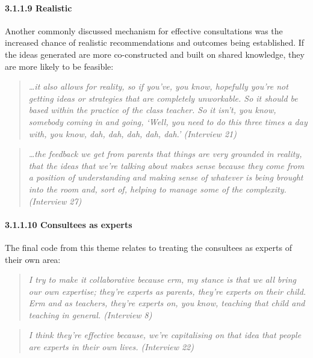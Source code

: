 \documentclass[
]{article}
\begin{document}
\hypertarget{realistic}{%
\paragraph{3.1.1.9 Realistic}\label{realistic}}

Another commonly discussed mechanism for effective consultations was the
increased chance of realistic recommendations and outcomes being
established. If the ideas generated are more co-constructed and built on
shared knowledge, they are more likely to be feasible:

\begin{quote}
\emph{\ldots it also allows for reality, so if you've, you know,
hopefully you're not getting ideas or strategies that are completely
unworkable. So it should be based within the practice of the class
teacher. So it isn't, you know, somebody coming in and going, `Well, you
need to do this three times a day with, you know, dah, dah, dah, dah,
dah.' (Interview 21)}
\end{quote}

\begin{quote}
\emph{\ldots the feedback we get from parents that things are very
grounded in reality, that the ideas that we're talking about makes sense
because they come from a position of understanding and making sense of
whatever is being brought into the room and, sort of, helping to manage
some of the complexity. (Interview 27)}
\end{quote}

\hypertarget{consultees-as-experts}{%
\paragraph{3.1.1.10 Consultees as experts}\label{consultees-as-experts}}

The final code from this theme relates to treating the consultees as
experts of their own area:

\begin{quote}
\emph{I try to make it collaborative because erm, my stance is that we
all bring our own expertise; they're experts as parents, they're experts
on their child. Erm and as teachers, they're experts on, you know,
teaching that child and teaching in general. (Interview 8)}
\end{quote}

\begin{quote}
\emph{I think they're effective because, we're capitalising on that idea
that people are experts in their own lives. (Interview 22)}
\end{quote}
\end{document}
